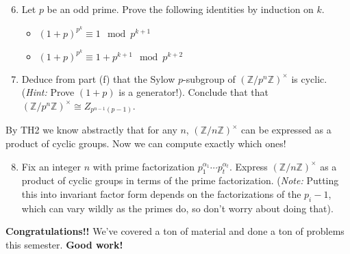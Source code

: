 \documentclass[11pt]{article}
\newcommand{\bZ}{\mathbb{Z}}
\begin{document}
\begin{enumerate}
{  \begin{enumerate}
    \setcounter{enumii}{5}
    \item{
    Let $p$ be an odd prime.  Prove the following identities by induction on $k$.
    \begin{itemize}
      \item{$(1+p)^{p^k}\equiv 1\mod p^{k+1}$}
      \item{$(1+p)^{p^k}\equiv1+p^{k+1}\mod p^{k+2}$}
    \end{itemize}
    }
    \item{
    Deduce from part (f) that the Sylow $p$-subgroup of $(\bZ/p^n\bZ)^\times$ is cyclic.  (\textit{Hint:} Prove $(1+p)$ is a generator!).  Conclude that that $(\bZ/p^n\bZ)^\times\cong Z_{p^{n-1}(p-1)}$.
    }
  \end{enumerate}
  By TH2 we know abstractly that for any $n$, $(\bZ/n\bZ)^\times$ can be expressed as a product of cyclic groups.  Now we can compute exactly which ones!
  \begin{enumerate}
    \setcounter{enumii}{7}
    \item{
    Fix an integer $n$ with prime factorization $p_1^{\alpha_1}\cdots p_t^{\alpha_t}$.  Express $(\bZ/n\bZ)^\times$ as a product of cyclic groups in terms of the prime factorization.  (\textit{Note:} Putting this into invariant factor form depends on the factorizations of the $p_i-1$, which can vary wildly as the primes do, so don't worry about doing that).
    }
  \end{enumerate}
  }
\end{enumerate}
\textbf{Congratulations!!}  We've covered a ton of material and done a ton of problems this semester.  \textbf{Good work!}
\end{document}
